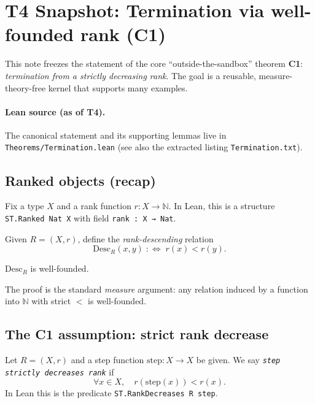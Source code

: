 \section{T4 Snapshot: Termination via well-founded rank (C1)}
\label{sec:t4-termination}

This note freezes the statement of the core ``outside-the-sandbox'' theorem \textbf{C1}:
\emph{termination from a strictly decreasing rank}.
The goal is a reusable, measure-theory-free kernel that supports many examples.

\paragraph{Lean source (as of T4).}
The canonical statement and its supporting lemmas live in
\texttt{Theorems/Termination.lean} (see also the extracted listing \texttt{Termination.txt}).

\subsection{Ranked objects (recap)}
Fix a type $X$ and a rank function $r : X \to \mathbb{N}$.
In Lean, this is a structure \texttt{ST.Ranked Nat X} with field \texttt{rank : X → Nat}.

\begin{definition}
\label{def:desc}
Given $R=(X,r)$, define the \emph{rank-descending} relation
\[
  \mathrm{Desc}_R(x,y) \;:\!\!\iff\; r(x) < r(y).
\]
\end{definition}

\begin{lemma}
\label{lem:wf-desc}
$\mathrm{Desc}_R$ is well-founded.
\end{lemma}

\noindent
The proof is the standard \emph{measure} argument: any relation induced by a function into $\mathbb{N}$
with strict $<$ is well-founded.

\subsection{The C1 assumption: strict rank decrease}
\begin{definition}
\label{def:rankdecreases}
Let $R=(X,r)$ and a step function $\mathrm{step}:X\to X$ be given.
We say \emph{\texttt{step strictly decreases rank}} if
\[
  \forall x\in X,\quad r(\mathrm{step}(x)) < r(x).
\]
In Lean this is the predicate \texttt{ST.RankDecreases R step}.
\end{definition}

